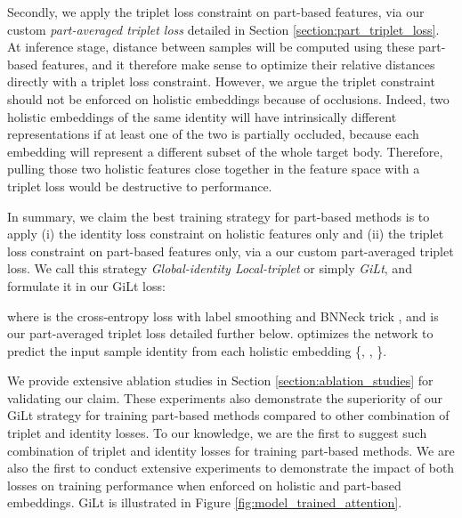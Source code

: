 \documentclass[10pt,twocolumn,letterpaper]{article}
\begin{document}
Secondly, we apply the triplet loss constraint on part-based features, via our custom \textit{part-averaged triplet loss} detailed in Section \ref{section:part_triplet_loss}.
At inference stage, distance between samples will be computed using these part-based features, and it therefore make sense to optimize their relative distances directly with a triplet loss constraint.
However, we argue the triplet constraint should not be enforced on holistic embeddings because of occlusions.
Indeed, two holistic embeddings of the same identity will have intrinsically different representations if at least one of the two is partially occluded, because each embedding will represent a different subset of the whole target body.
Therefore, pulling those two holistic features close together in the feature space with a triplet loss would be destructive to performance.

In summary, we claim the best training strategy for part-based methods is to apply (i) the identity loss constraint on holistic features only and (ii) the triplet loss constraint on part-based features only, via a our custom part-averaged triplet loss.
We call this strategy \textit{Global-identity Local-triplet} or simply \textit{GiLt}, and formulate it in our GiLt loss:
{\small{

}}
where  is the cross-entropy loss with label smoothing \cite{label_smoothing} and BNNeck trick \cite{BoT}, and  is our part-averaged triplet loss detailed further below.
 optimizes the network to predict the input sample identity from each holistic embedding \{, , \}.








We provide extensive ablation studies in Section \ref{section:ablation_studies} for validating our claim.
These experiments also demonstrate the superiority of our GiLt strategy for training part-based methods compared to other combination of triplet and identity losses.
To our knowledge, we are the first to suggest such combination of triplet and identity losses for training part-based methods.
We are also the first to conduct extensive experiments to demonstrate the impact of both losses on training performance when enforced on holistic and part-based embeddings.
GiLt is illustrated in Figure \ref{fig:model_trained_attention}.
\end{document}
